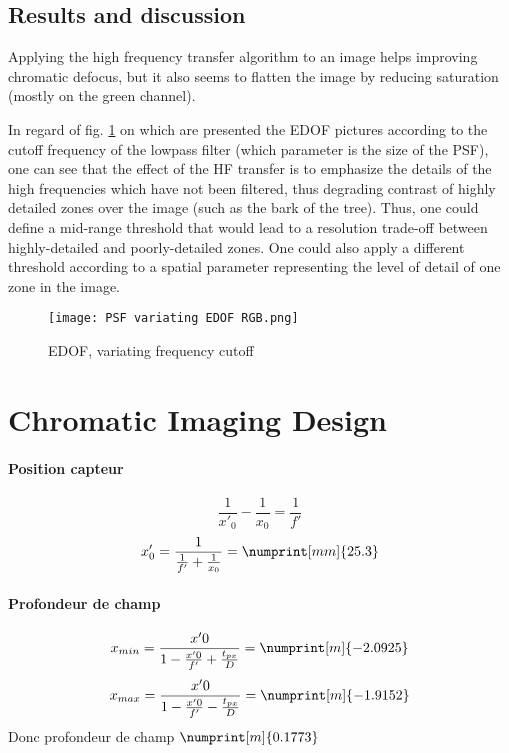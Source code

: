 \documentclass[10pt,letterpaper]{article}
\begin{document}
\subsection*{Results and discussion}
Applying the high frequency transfer algorithm to an image helps improving chromatic defocus, but it also seems to flatten the image by reducing saturation (mostly on the green channel).

In regard of fig. \ref{fig:cutoff} on which are presented the EDOF pictures according to the cutoff frequency of the lowpass filter (which parameter is the size of the PSF), one can see that the effect of the HF transfer is to emphasize the details of the high frequencies which have not been filtered, thus degrading contrast of highly detailed zones over the image (such as the bark of the tree). Thus, one could define a mid-range threshold that would lead to a resolution trade-off between highly-detailed and poorly-detailed zones. One could also apply a different threshold according to a spatial parameter representing the level of detail of one zone in the image.

\begin{figure}[h]
	\centering
	\texttt{[image: PSF variating EDOF RGB.png]}
	\caption{EDOF, variating frequency cutoff}
	\label{fig:cutoff}
\end{figure}





\section{Chromatic Imaging Design}
\paragraph{Position capteur}
$$\frac{1}{x'_0} - \frac{1}{x_0} = \frac{1}{f'}$$
$$x'_0=\frac{1}{\frac{1}{f'} + \frac{1}{x_0}} = \numprint[mm]{25.3}$$

\paragraph{Profondeur de champ}
$$x_{min} = \frac{x'0}{1-\frac{x'0}{f'} + \frac{t_{px}}{D}} = \numprint[m]{-2.0925}$$
$$x_{max} = \frac{x'0}{1-\frac{x'0}{f'} - \frac{t_{px}}{D}} = \numprint[m]{-1.9152}$$
Donc profondeur de champ $\numprint[m]{0.1773}$
\listoffigures
\end{document}

